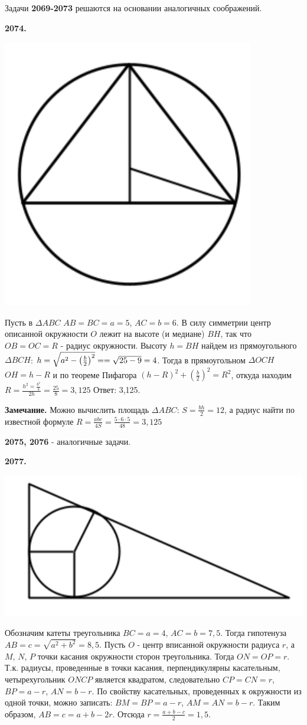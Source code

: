 Задачи \textbf{2069-2073}  решаются на основании аналогичных соображений.

\textbf{2074.}

{\centering \includegraphics[width=0.35\linewidth]{Geometry/Content/37.png}
	
}

Пусть в $\Delta ABC$ $AB = BC = a = 5$, $AC = b = 6$. В силу симметрии центр описанной окружности $O$ лежит на  высоте (и медиане) $BH$, так что  $OB=OC=R$ - радиус окружности. Высоту $h = BH$ найдем из прямоугольного $\Delta BCH$: $h = \sqrt{a^2-\left( \frac{b}{2} \right)^2} = \linebreak=\sqrt{25-9} = 4$. Тогда в прямоугольном $\Delta OCH$ $OH = h - R$ и по теореме Пифагора $(h - R)^2 + \left( \frac{b}{2} \right)^2 = R^2$, откуда находим $R = \frac{h^2  =\frac{b^2}{4}}{2h} = \frac{25}{8} = 3,125$ \newline \null \hspace*{\fill} Ответ: 3,125.

\textbf{Замечание.} Можно вычислить площадь $\Delta ABC$: $S = \frac{bh}{2}=12$, а радиус 
найти по известной формуле $R = \frac{abc}{4S} = \frac{5\cdot6\cdot5}{48} = 3,125$

\textbf{2075, 2076} - аналогичные задачи.

\textbf{2077.}

{\centering \includegraphics[width=0.5\linewidth]{Geometry/Content/38.png}
	
}

Обозначим  катеты треугольника $BC = a= 4$, $AC = b = 7,5$. Тогда гипотенуза $AB = c = \sqrt{a^2 + b^2} = 8,5$.  Пусть $O$ - центр вписанной окружности радиуса $r$, а $M$, $N$, $P$ точки касания окружности сторон треугольника. Тогда $ON = OP = r$. Т.к. радиусы, проведенные в точки касания, перпендикулярны касательным, четырехугольник $ONCP$ является квадратом, следовательно $CP = CN = r$, $BP = a - r$, $AN = b - r$. По свойству касательных, проведенных к окружности из одной точки, можно записать: $BM = BP = a- r$, $AM = AN = b - r$. Таким образом, $AB = c = a + b - 2r$. Отсюда $r = \frac{a + b - c}{2} = 1,5$.

